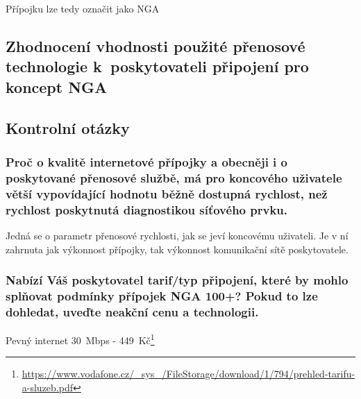 \documentclass[a4paper,12pt]{article}   %
\begin{document}
Přípojku lze tedy označit jako NGA

\subsection*{Zhodnocení vhodnosti použité přenosové technologie k~poskytovateli připojení pro koncept NGA}

\subsection*{Kontrolní otázky}
\subsubsection*{Proč o kvalitě internetové přípojky a obecněji i o poskytované přenosové službě, má pro koncového uživatele větší vypovídající hodnotu běžně dostupná rychlost, než rychlost poskytnutá diagnostikou síťového prvku.}
Jedná se o parametr přenosové rychlosti, jak se jeví koncovému uživateli. Je v ní zahrnuta jak výkonnost přípojky, tak výkonnost komunikační sítě poskytovatele.

\subsubsection*{Nabízí Váš poskytovatel tarif/typ připojení, které by mohlo splňovat podmínky přípojek NGA 100+? Pokud to lze dohledat, uveďte neakční cenu a technologii.}
Pevný internet 30~Mbps - 449~Kč\footnote{\url{https://www.vodafone.cz/_sys_/FileStorage/download/1/794/prehled-tarifu-a-sluzeb.pdf}}
\end{document}
